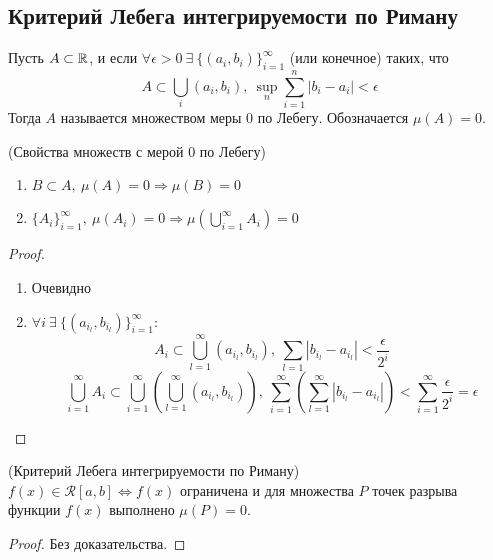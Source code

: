 \subsection{Критерий Лебега интегрируемости по Риману}
\begin{definition}
    Пусть $A\subset \mathbb{R}$, и если $\forall \epsilon>0\ \exists\ \{(a_i,b_i)\}_{i=1}^{\infty}$ (или конечное) таких, что 
    \[A\subset \bigcup\limits_i(a_i,b_i),\ \sup\limits_n \sum\limits_{i=1}^{n}|b_i-a_i|< \epsilon\]
    Тогда $A$ называется множеством меры 0 по Лебегу. Обозначается $\mu(A)=0$.
\end{definition} 
\begin{theorem} (Свойства множеств с мерой 0 по Лебегу)
    \begin{enumerate}
        \item $B\subset A,\ \mu(A)=0 \Rightarrow \mu(B)=0$
        \item $\{A_i\}_{i=1}^{\infty},\ \mu(A_i)=0 \Rightarrow \mu(\bigcup\limits_{i=1}^{\infty} A_i)=0$
    \end{enumerate}
\end{theorem} 
\begin{proof} \
    \begin{enumerate}
        \item Очевидно
        \item $\forall i\ \exists\ \{(a_{i_l},b_{i_l})\}_{i=1}^{\infty}:$
        \[A_i\subset \bigcup\limits_{l=1}^{\infty} (a_{i_l},b_{i_l}),\ \sum\limits_{l=1} |b_{i_l}-a_{i_l}|<\frac{\epsilon}{2^i}\]
        \[\bigcup\limits_{i=1}^{\infty} A_i \subset \bigcup\limits_{i=1}^{\infty}\left(\bigcup\limits_{l=1}^{\infty} (a_{i_l},b_{i_l})\right),\ \sum\limits_{i=1}^{\infty}\left(\sum\limits_{l=1}^{\infty} |b_{i_l}-a_{i_l}|\right)<\sum\limits_{i=1}^{\infty}\frac{\epsilon}{2^i}=\epsilon\]
    \end{enumerate}
\end{proof} 
\begin{theorem} (Критерий Лебега интегрируемости по Риману)\\
    $f(x)\in \mathcal{R}[a,b] \Leftrightarrow f(x)$ ограничена и для множества $P$ точек разрыва функции $f(x)$ выполнено $\mu(P)=0$.
\end{theorem} 
\begin{proof}
    Без доказательства.
\end{proof} 
